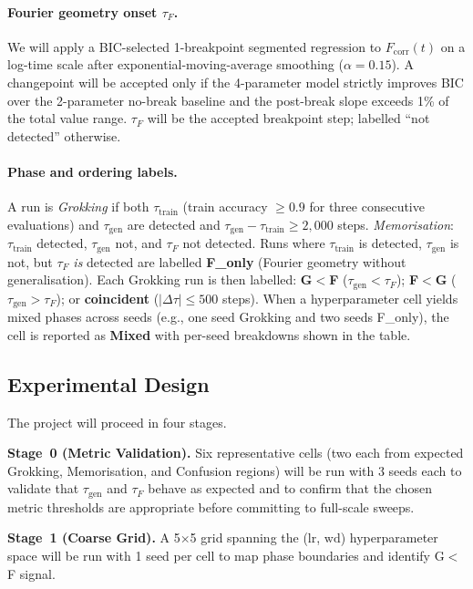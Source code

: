 \documentclass[12pt,openany,a4paper]{book}
\newcommand{\taug}{\tau_{\mathrm{gen}}}
\newcommand{\tauf}{\tau_{F}}
\newcommand{\Dtau}{\Delta\tau}
\newcommand{\fcorr}{F_{\mathrm{corr}}}
\begin{document}
\paragraph{Fourier geometry onset $\tauf$.}
We will apply a BIC-selected
\cite{schwarz1978bic} 1-breakpoint segmented regression
\cite{muggeo2003segmented} to $\fcorr(t)$ on a log-time scale
after exponential-moving-average smoothing ($\alpha = 0.15$).
A changepoint will be accepted only if the 4-parameter model strictly
improves BIC over the 2-parameter no-break baseline and the
post-break slope exceeds 1\% of the total value range.
$\tauf$ will be the accepted breakpoint step; labelled ``not detected''
otherwise.

\paragraph{Phase and ordering labels.}
A run is \textit{Grokking} if both $\tau_{\mathrm{train}}$
(train accuracy $\geq0.9$ for three consecutive evaluations)
and $\taug$ are detected and $\taug - \tau_{\mathrm{train}}
\geq 2{,}000$ steps.
\textit{Memorisation}: $\tau_{\mathrm{train}}$ detected, $\taug$ not,
and $\tauf$ not detected.
Runs where $\tau_{\mathrm{train}}$ is detected, $\taug$ is not, but
$\tauf$ \emph{is} detected are labelled \textbf{F\_only} (Fourier
geometry without generalisation).
Each Grokking run is then labelled:
\textbf{G$<$F} ($\taug < \tauf$);
\textbf{F$<$G} ($\taug > \tauf$);
or \textbf{coincident} ($|\Dtau| \leq 500$ steps).
When a hyperparameter cell yields mixed phases across seeds (e.g.,
one seed Grokking and two seeds F\_only), the cell is reported as
\textbf{Mixed} with per-seed breakdowns shown in the table.

\subsection{Experimental Design}

The project will proceed in four stages.

\textbf{Stage~0 (Metric Validation).}
Six representative cells (two each from expected Grokking,
Memorisation, and Confusion regions) will be run with 3 seeds each
to validate that $\taug$ and $\tauf$ behave as expected and to
confirm that the chosen metric thresholds are appropriate before
committing to full-scale sweeps.

\textbf{Stage~1 (Coarse Grid).}
A 5$\times$5 grid spanning the ($\mathrm{lr}$, $\mathrm{wd}$)
hyperparameter space will be run with 1 seed per cell to map phase
boundaries and identify G$<$F signal.
\end{document}
